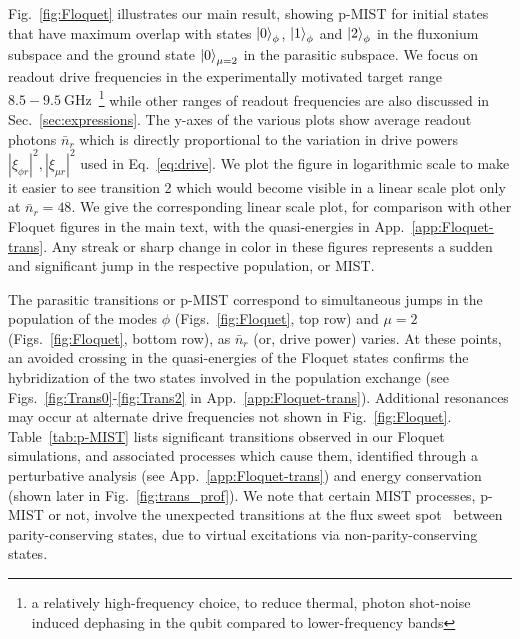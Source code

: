 \documentclass[%
reprint,
superscriptaddress,
 amsmath,amssymb,
 aps,
 prx,
longbibliography,
floatfix,
]{revtex4-2}
\begin{document}
Fig.~\ref{fig:Floquet} illustrates our main result, showing p-MIST for initial states that have maximum overlap with states $\ket{0}_\phi$, $\ket{1}_\phi$ and $\ket{2}_\phi$ in the fluxonium subspace and the ground state $\ket{0}_{\mu=2}$ in the parasitic subspace. We focus on readout drive frequencies in the experimentally motivated target range $8.5 - 9.5 \ \mathrm{GHz}$~\footnote{a relatively high-frequency choice, to reduce thermal, photon shot-noise induced dephasing in the qubit compared to lower-frequency bands} while other ranges of readout frequencies are also discussed in Sec.~\ref{sec:expressions}. The y-axes of the various plots show average readout photons $\bar n_r$ which is directly proportional to the variation in drive powers $|\xi_{\phi r}|^2,|\xi_{\mu r}|^2$ used in Eq.~\ref{eq:drive}. We plot the figure in logarithmic scale to make it easier to see transition 2 which would become visible in a linear scale plot only at $\bar n_r=48$. We give the corresponding linear scale plot, for comparison with other Floquet figures in the main text, with the quasi-energies in App.~\ref{app:Floquet-trans}. Any streak or sharp change in color in these figures represents a sudden and significant jump in the respective population, or MIST. 

The parasitic transitions or p-MIST correspond to simultaneous jumps in the population of the modes $\phi$ (Figs.~\ref{fig:Floquet}, top row) and $\mu=2$ (Figs.~\ref{fig:Floquet}, bottom row), as $\bar{n}_r$ (or, drive power) varies. At these points, an avoided crossing in the quasi-energies of the Floquet states confirms the hybridization of the two states involved in the population exchange (see Figs.~\ref{fig:Trans0}-\ref{fig:Trans2} in App.~\ref{app:Floquet-trans}). Additional resonances may occur at alternate drive frequencies not shown in Fig.~\ref{fig:Floquet}. Table~\ref{tab:p-MIST} lists significant transitions observed in our Floquet simulations, and associated processes which cause them, identified through a perturbative analysis (see App.~\ref{app:Floquet-trans}) and energy conservation (shown later in Fig.~\ref{fig:trans_prof}). We note that certain MIST processes, p-MIST or not, involve the unexpected transitions at the flux sweet spot~\cite{zhu_circuit_2013} between parity-conserving states, due to virtual excitations via non-parity-conserving states. 
\end{document}

